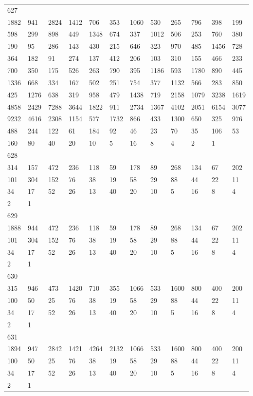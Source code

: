 \begin{longtable}{llllllllllll}
627&&&&&&&&&&&\\
1882& 941& 2824& 1412& 706& 353& 1060& 530& 265& 796& 398& 199\\
598& 299& 898& 449& 1348& 674& 337& 1012& 506& 253& 760& 380\\
190& 95& 286& 143& 430& 215& 646& 323& 970& 485& 1456& 728\\
364& 182& 91& 274& 137& 412& 206& 103& 310& 155& 466& 233\\
700& 350& 175& 526& 263& 790& 395& 1186& 593& 1780& 890& 445\\
1336& 668& 334& 167& 502& 251& 754& 377& 1132& 566& 283& 850\\
425& 1276& 638& 319& 958& 479& 1438& 719& 2158& 1079& 3238& 1619\\
4858& 2429& 7288& 3644& 1822& 911& 2734& 1367& 4102& 2051& 6154& 3077\\
9232& 4616& 2308& 1154& 577& 1732& 866& 433& 1300& 650& 325& 976\\
488& 244& 122& 61& 184& 92& 46& 23& 70& 35& 106& 53\\
160& 80& 40& 20& 10& 5& 16& 8& 4& 2& 1& \\

628&&&&&&&&&&&\\
314& 157& 472& 236& 118& 59& 178& 89& 268& 134& 67& 202\\
101& 304& 152& 76& 38& 19& 58& 29& 88& 44& 22& 11\\
34& 17& 52& 26& 13& 40& 20& 10& 5& 16& 8& 4\\
2& 1& \\

629&&&&&&&&&&&\\
1888& 944& 472& 236& 118& 59& 178& 89& 268& 134& 67& 202\\
101& 304& 152& 76& 38& 19& 58& 29& 88& 44& 22& 11\\
34& 17& 52& 26& 13& 40& 20& 10& 5& 16& 8& 4\\
2& 1& \\

630&&&&&&&&&&&\\
315& 946& 473& 1420& 710& 355& 1066& 533& 1600& 800& 400& 200\\
100& 50& 25& 76& 38& 19& 58& 29& 88& 44& 22& 11\\
34& 17& 52& 26& 13& 40& 20& 10& 5& 16& 8& 4\\
2& 1& \\

631&&&&&&&&&&&\\
1894& 947& 2842& 1421& 4264& 2132& 1066& 533& 1600& 800& 400& 200\\
100& 50& 25& 76& 38& 19& 58& 29& 88& 44& 22& 11\\
34& 17& 52& 26& 13& 40& 20& 10& 5& 16& 8& 4\\
2& 1& \\


\end{longtable}
